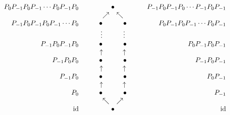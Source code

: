\begin{align*}
  \begin{array}{crcccccrc}
    &P_0P_{-1}P_0P_{-1}\cdots P_{0}P_{-1}P_0&&&\bullet&&&P_{-1}P_0P_{-1}P_{0}\cdots P_{-1}P_0P_{-1}\\
    &&&&\nearrow\phantom{\bullet}\nwarrow&\\
    &P_{-1}P_0P_{-1}P_0P_{-1}\cdots P_{0}&&&\bullet\phantom{\nearrow\bullet\nwarrow}\bullet&&&P_0P_{-1}P_{0}P_{-1}\cdots P_0P_{-1}\\
    &&&&\vdots\phantom{\nearrow\bullet\swarrow}\vdots\\
    &P_{-1}P_0P_{-1}P_0&&&\bullet\phantom{\nearrow\bullet\nwarrow}\bullet&&&P_{0}P_{-1}P_{0}P_{-1}\\
    &&&&\uparrow\phantom{\nearrow\,\,\nwarrow}\uparrow&\\
    &P_{-1}P_0P_0&&&\bullet\phantom{\nearrow\bullet\nwarrow}\bullet&&&P_{-1}P_0P_{-1}\\
    &&&&\uparrow\phantom{\nearrow\,\,\nwarrow}\uparrow&\\
    &P_{-1}P_0&&&\bullet\phantom{\nearrow\bullet\nwarrow}\bullet&&&P_0P_{-1}\\
    &&&&\uparrow\phantom{\nearrow\,\,\nwarrow}\uparrow&\\
    &P_0&&&\bullet\phantom{\nearrow\bullet\nwarrow}\bullet&&&P_{-1}&\\
    &&&&\nwarrow\phantom{\bullet}\nearrow&\\
    &\operatorname{id} &&&\bullet &&&\operatorname{id}
  \end{array}
\end{align*}


